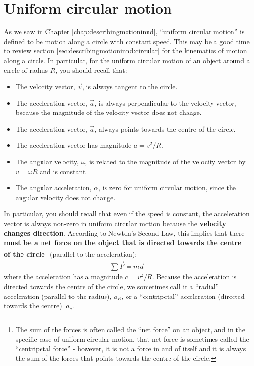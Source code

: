 \section{Uniform circular motion}
As we saw in Chapter \ref{chap:describingmotioninnd}, ``uniform circular motion'' is defined to be motion along a circle with constant speed. This may be a good time to review section \ref{sec:describingmotioninnd:circular} for the kinematics of motion along a circle. In particular, for the uniform circular motion of an object around a circle of radius $R$, you should recall that:
\begin{itemize}
\item The velocity vector, $\vec v$, is always tangent to the circle.
\item The acceleration vector, $\vec a$, is always perpendicular to the velocity vector, because the magnitude of the velocity vector does not change.
\item The acceleration vector, $\vec a$, always points towards the centre of the circle.
\item The acceleration vector has magnitude $a=v^2/R$.
\item The angular velocity, $\omega$, is related to the magnitude of the velocity vector by $v=\omega R$ and is constant.
\item The angular acceleration, $\alpha$, is zero for uniform circular motion, since the angular velocity does not change.
\end{itemize}
In particular, you should recall that even if the speed is constant, the acceleration vector is always non-zero in uniform circular motion because the \textbf{velocity changes direction}. According to Newton's Second Law, this implies that there \textbf{must be a net force on the object that is directed towards the centre of the circle}\footnote{The sum of the forces is often called the ``net force'' on an object, and in the specific case of uniform circular motion, that net force is sometimes called the ``centripetal force'' - however, it is not a force in and of itself and it is always the sum of the forces that points towards the centre of the circle.} (parallel to the acceleration):
\begin{align*}
\sum \vec F = m\vec a
\end{align*} 
where the acceleration has a magnitude $a=v^2/R$. Because the acceleration is directed towards the centre of the circle, we sometimes call it a ``radial'' acceleration (parallel to the radius), $a_R$, or a ``centripetal'' acceleration (directed towards the centre), $a_c$.

